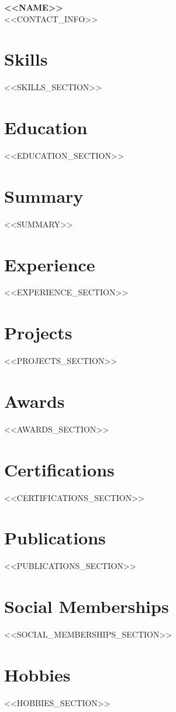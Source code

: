 \documentclass[<<FONT_SIZE>>,a4paper]{article}
\begin{document}
\noindent
\begin{minipage}[t]{\textwidth}
    {\Huge \textbf{<<NAME>>}} \\
    {<<CONTACT_INFO>>}
\end{minipage}

\vspace{5mm}

\noindent
\begin{minipage}[t]{0.3\textwidth}
    \section*{Skills}
    <<SKILLS_SECTION>>
    
    \vspace{5mm}
    
    \section*{Education}
    <<EDUCATION_SECTION>>
\end{minipage}
\hfill
\begin{minipage}[t]{0.65\textwidth}
    \section*{Summary}
    <<SUMMARY>>

    \section*{Experience}
    <<EXPERIENCE_SECTION>>

    \section*{Projects}
    <<PROJECTS_SECTION>>

    \section*{Awards}
    <<AWARDS_SECTION>>

    \section*{Certifications}
    <<CERTIFICATIONS_SECTION>>

    \section*{Publications}
    <<PUBLICATIONS_SECTION>>

    \section*{Social Memberships}
    <<SOCIAL_MEMBERSHIPS_SECTION>>

    \section*{Hobbies}
    <<HOBBIES_SECTION>>
\end{minipage}
\end{document}
